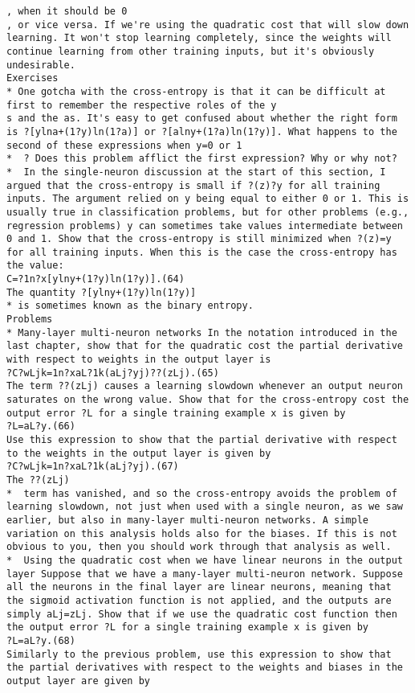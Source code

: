 \begin{lstlisting}
, when it should be 0
, or vice versa. If we're using the quadratic cost that will slow down learning. It won't stop learning completely, since the weights will continue learning from other training inputs, but it's obviously undesirable.
Exercises
* One gotcha with the cross-entropy is that it can be difficult at first to remember the respective roles of the y
s and the as. It's easy to get confused about whether the right form is ?[ylna+(1?y)ln(1?a)] or ?[alny+(1?a)ln(1?y)]. What happens to the second of these expressions when y=0 or 1
*  ? Does this problem afflict the first expression? Why or why not? 
*  In the single-neuron discussion at the start of this section, I argued that the cross-entropy is small if ?(z)?y for all training inputs. The argument relied on y being equal to either 0 or 1. This is usually true in classification problems, but for other problems (e.g., regression problems) y can sometimes take values intermediate between 0 and 1. Show that the cross-entropy is still minimized when ?(z)=y for all training inputs. When this is the case the cross-entropy has the value: 
C=?1n?x[ylny+(1?y)ln(1?y)].(64)
The quantity ?[ylny+(1?y)ln(1?y)]
* is sometimes known as the binary entropy.
Problems
* Many-layer multi-neuron networks In the notation introduced in the last chapter, show that for the quadratic cost the partial derivative with respect to weights in the output layer is 
?C?wLjk=1n?xaL?1k(aLj?yj)??(zLj).(65)
The term ??(zLj) causes a learning slowdown whenever an output neuron saturates on the wrong value. Show that for the cross-entropy cost the output error ?L for a single training example x is given by 
?L=aL?y.(66)
Use this expression to show that the partial derivative with respect to the weights in the output layer is given by 
?C?wLjk=1n?xaL?1k(aLj?yj).(67)
The ??(zLj)
*  term has vanished, and so the cross-entropy avoids the problem of learning slowdown, not just when used with a single neuron, as we saw earlier, but also in many-layer multi-neuron networks. A simple variation on this analysis holds also for the biases. If this is not obvious to you, then you should work through that analysis as well.
*  Using the quadratic cost when we have linear neurons in the output layer Suppose that we have a many-layer multi-neuron network. Suppose all the neurons in the final layer are linear neurons, meaning that the sigmoid activation function is not applied, and the outputs are simply aLj=zLj. Show that if we use the quadratic cost function then the output error ?L for a single training example x is given by 
?L=aL?y.(68)
Similarly to the previous problem, use this expression to show that the partial derivatives with respect to the weights and biases in the output layer are given by 

\end{lstlisting}
